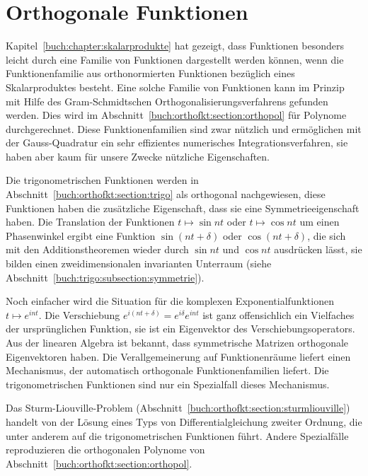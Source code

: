 %
%
%
\chapter{Orthogonale Funktionen
\label{buch:chapter:orthofunkt}}
Kapitel~\ref{buch:chapter:skalarprodukte} hat gezeigt, dass Funktionen
besonders leicht durch eine Familie von Funktionen dargestellt werden 
können, wenn die Funktionenfamilie aus orthonormierten Funktionen
bezüglich eines Skalarproduktes besteht.
Eine solche Familie von Funktionen kann im Prinzip mit Hilfe des
Gram-Schmidtschen Orthogonalisierungsverfahrens gefunden werden.
Dies wird im Abschnitt~\ref{buch:orthofkt:section:orthopol} für
Polynome durchgerechnet.
Diese Funktionenfamilien sind zwar nützlich und ermöglichen mit
der Gauss-Quadratur ein sehr effizientes numerisches
Integrationsverfahren, sie haben aber kaum für unsere Zwecke
nützliche Eigenschaften.

Die trigonometrischen Funktionen werden in
Abschnitt~\ref{buch:orthofkt:section:trigo} als orthogonal nachgewiesen,
diese Funktionen haben die zusätzliche Eigenschaft, dass sie eine
Symmetrieeigenschaft haben.
Die Translation der Funktionen $t\mapsto \sin nt$ oder
$t\mapsto\cos nt$ um einen Phasenwinkel ergibt eine Funktion
$\sin(nt+\delta)$ oder $\cos(nt+\delta)$, die sich mit den Additionstheoremen
wieder durch $\sin nt$ und $\cos nt$ ausdrücken lässt, sie bilden 
einen zweidimensionalen invarianten Unterraum
(siehe Abschnitt~\ref{buch:trigo:subsection:symmetrie}).

Noch einfacher wird die Situation für die komplexen Exponentialfunktionen
$t\mapsto e^{int}$.
Die Verschiebung $e^{i(nt+\delta)}=e^{i\delta}e^{int}$ ist ganz
offensichlich ein Vielfaches der ursprünglichen Funktion, sie ist
ein Eigenvektor des Verschiebungsoperators.
Aus der linearen Algebra ist bekannt, dass symmetrische Matrizen 
orthogonale Eigenvektoren haben.
Die Verallgemeinerung auf Funktionenräume liefert einen Mechanismus,
der automatisch orthogonale Funktionenfamilien liefert.
Die trigonometrischen Funktionen sind nur ein Spezialfall dieses
Mechanismus.

Das Sturm-Liouville-Problem
(Abschnitt~\ref{buch:orthofkt:section:sturmliouville})
handelt von der Lösung eines Typs
von Differentialgleichung zweiter Ordnung, die unter anderem auf
die trigonometrischen Funktionen führt.
Andere Spezialfälle reproduzieren die orthogonalen Polynome
von Abschnitt~\ref{buch:orthofkt:section:orthopol}.


